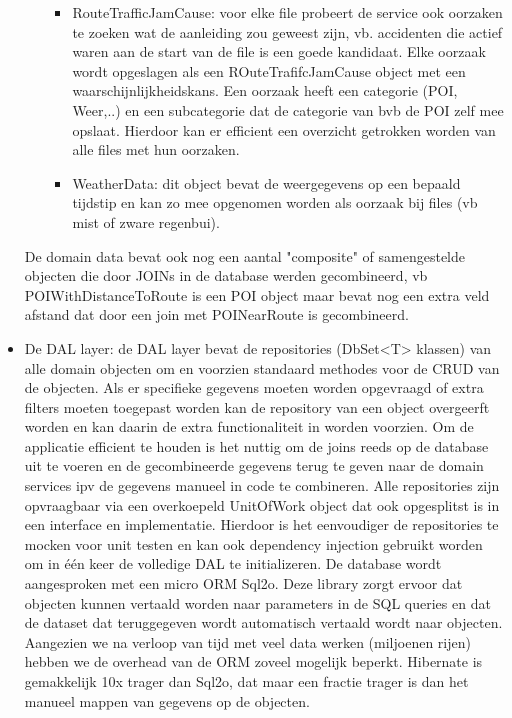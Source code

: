 \begin{itemize}
\begin{itemize}
\begin{itemize}
    \item RouteTrafficJamCause: voor elke file probeert de service ook oorzaken te zoeken wat de aanleiding zou geweest zijn, vb. accidenten die actief waren aan de start van de file is een goede kandidaat. Elke oorzaak wordt opgeslagen als een ROuteTrafifcJamCause object met een waarschijnlijkheidskans. Een oorzaak heeft een categorie (POI, Weer,..) en een subcategorie dat de categorie van bvb de POI zelf mee opslaat. Hierdoor kan er efficient een overzicht getrokken worden van alle files met hun oorzaken.
    \newline
    \item WeatherData: dit object bevat de weergegevens op een bepaald tijdstip en kan zo mee opgenomen worden als oorzaak bij files (vb mist of zware regenbui).
    \end{itemize}
  \end{itemize}
De domain data bevat ook nog een aantal "composite" of samengestelde objecten die door JOINs in de database werden gecombineerd, vb POIWithDistanceToRoute is een POI object maar bevat nog een extra veld afstand dat door een join met POINearRoute is gecombineerd.

\item De DAL layer: de DAL layer bevat de repositories (DbSet<T> klassen) van alle domain objecten om en voorzien standaard methodes voor de CRUD van de objecten. Als er specifieke gegevens moeten worden opgevraagd of extra filters moeten toegepast worden kan de repository van een object overgeerft worden en kan daarin de extra functionaliteit in worden voorzien. Om de applicatie efficient te houden is het nuttig om de joins reeds op de database uit te voeren en de gecombineerde gegevens terug te geven naar de domain services ipv de gegevens manueel in code te combineren.
\newline
Alle repositories zijn opvraagbaar via een overkoepeld UnitOfWork object dat ook opgesplitst is in een interface en implementatie. Hierdoor is het eenvoudiger de repositories te mocken voor unit testen en kan ook dependency injection gebruikt worden om in één keer de volledige DAL te initializeren.
\newline
De database wordt aangesproken met een micro ORM Sql2o. Deze library zorgt ervoor dat objecten kunnen vertaald worden naar parameters in de SQL queries en dat de dataset dat teruggegeven wordt automatisch vertaald wordt naar objecten. Aangezien we na verloop van tijd met veel data werken (miljoenen rijen) hebben we de overhead van de ORM zoveel mogelijk beperkt. Hibernate is gemakkelijk 10x trager dan Sql2o, dat maar een fractie trager is dan het manueel mappen van gegevens op de objecten.

\end{itemize}


